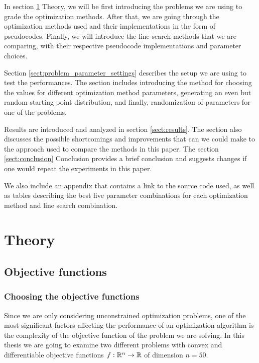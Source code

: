 \documentclass[english, 12pt, a4paper, sci, utf8, a-1b, online, table]{aaltothesis}
\newcommand{\R}{\ensuremath\mathbb{R}}
\begin{document}
In section \ref{sect:theory} Theory, we will be first introducing the problems we are using to grade the optimization methods. After that, we are going through the optimization methods used and their implementations in the form of pseudocodes. Finally, we will introduce the line search methods that we are comparing, with their respective pseudocode implementations and parameter choices.

Section \ref{sect:problem_parameter_settings} describes the setup we are using to test the performances. The section includes introducing the method for choosing the values for different optimization method parameters, generating an even but random starting point distribution, and finally, randomization of parameters for one of the problems.

Results are introduced and analyzed in section \ref{sect:results}. The section also discusses the possible shortcomings and improvements that can we could make to the approach used to compare the methods in this paper. The section \ref{sect:conclusion} Conclusion provides a brief conclusion and suggests changes if one would repeat the experiments in this paper.

We also include an appendix that contains a link to the source code used, as well as tables describing the best five parameter combinations for each optimization method and line search combination.


\section{Theory}
\label{sect:theory}


\subsection{Objective functions}


\subsubsection{Choosing the objective functions}


Since we are only considering unconstrained optimization problems, one of the most significant factors affecting the performance of an optimization algorithm is the complexity of the objective function of the problem we are solving. 
In this thesis we are going to examine two different problems with convex and differentiable objective functions $f : \R^n \rightarrow \R$ of dimension $n = 50$. 
\end{document}
